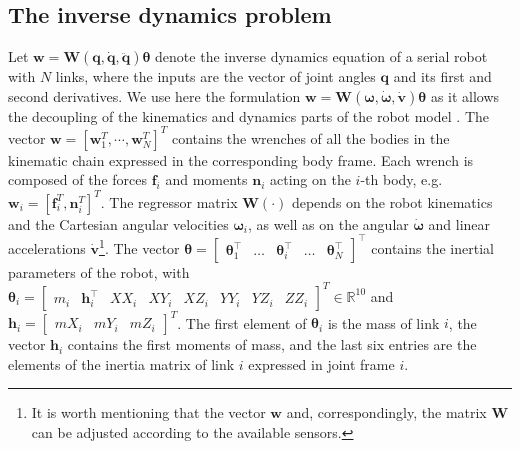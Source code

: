 \subsection{The inverse dynamics problem}
Let $ \bm{w} = \bm{W}\left(\bm{q},\dot{\bm{q}},\ddot{\bm{q}}\right)\bm{\theta} $ denote the inverse dynamics equation of a serial robot with $N$ links, where the inputs are the vector of joint angles $ \bm{q} $ and its first and second derivatives. We use here the formulation $ \bm{w} = \bm{W}\left(\bm{\omega},\dot{\bm{\omega}},\dot{\bm{v}}\right)\bm{\theta} $ as it allows the decoupling of the kinematics and dynamics parts of the robot model \cite{DiazLedezma2018FOPNetworksLearning}. The vector $\bm{w} = [\bm{w}^T_1,\cdots, \bm{w}^T_N]^T$ contains the wrenches of all the bodies in the kinematic chain expressed in the corresponding body frame. Each wrench is composed of the forces $\bm{f}_i$ and moments $\bm{n}_i$ acting on the $ i $-th body, e.g. $\bm{w}_i = \left[\bm{f}_i^T, \bm{n}_i^T \right]^T$. The regressor matrix $\bm{W}(\cdot)$ depends on the robot kinematics and the Cartesian angular velocities $\bm{\omega}_i$, as well as on the angular $\dot{\bm{\omega}}$ and linear accelerations $\dot{\bm{v}}$\footnote{It is worth mentioning that the vector $\bm{w}$ and, correspondingly, the matrix $\bm{W}$ can be adjusted according to the available sensors.}.
The vector $ \bm{\theta}=\begin{bmatrix} \bm{\theta}_1^\intercal & \ldots  & \bm{\theta}_i^\intercal & \ldots & \bm{\theta}_N^\intercal \end{bmatrix}^\intercal  $ contains the inertial parameters of the robot, with $ \bm{\theta}_i = [\begin{smallmatrix} m_i & \bm{h}^\intercal_i & XX_i & XY_i & XZ_i & YY_i & YZ_i & ZZ_i \end{smallmatrix}]^T \in \mathbb{R}^{10} $ and $ \bm{h}_i =
\begin{bmatrix} mX_i & mY_i & mZ_i\end{bmatrix}^T $. The first element of $\bm{\theta}_i$ is the mass of link $i$, the vector $\bm{h}_i$ contains the first moments of mass, and the last six entries are the elements of the inertia matrix of link $i$ expressed in joint frame $i$.

